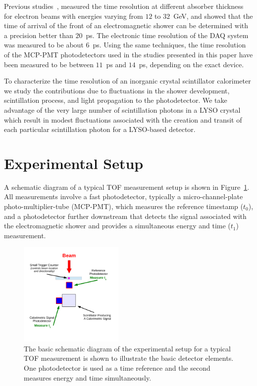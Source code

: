 Previous studies~\cite{MCPFastCaloNIMA}, measured the time resolution at different
absorber thickness for electron beams with energies varying from $12$ to
$32$~GeV, and showed that the time of arrival of the front of an electromagnetic
shower can be determined with a precision better than $20$~ps. The electronic
time resolution of the DAQ system was measured to be about $6$~ps. Using
the same techniques, the time resolution of the MCP-PMT photodetectors 
used in the studies presented in this paper have been measured to be between $11$~ps and $14$~ps, depending 
on the exact device.

To characterize the time resolution of an inorganic crystal scintillator calorimeter we
study the contributions due to fluctuations in the shower development, scintillation process, 
and light propagation to the photodetector.  We take advantage of the very large number of 
scintillation photons in a LYSO crystal which result in modest fluctuations associated with the 
creation and transit of each particular scintillation photon for a LYSO-based detector. 

\section{Experimental Setup}
A schematic diagram of a typical TOF measurement setup is shown in 
Figure~\ref{fig:TypicalSchematicDiagram}. All measurements involve a fast photodetector,  
typically a micro-channel-plate photo-multiplier-tube 
(MCP-PMT), which  measures the reference timestamp ($t_{0}$), and a photodetector further 
downstream that detects the signal associated with the electromagnetic shower and provides 
a simultaneous energy and time ($t_{1}$) measurement. 

\begin{figure}[h] \centering
\includegraphics[width=0.45\textwidth]{figs/TypicalSchematicDiagram} 
\caption{\small The basic schematic diagram of the experimental setup for
a typical TOF measurement is shown to illustrate the
basic detector elements. One photodetector is used as a time reference and the second 
measures energy and time simultaneously.} 
\label{fig:TypicalSchematicDiagram}
\end{figure}

